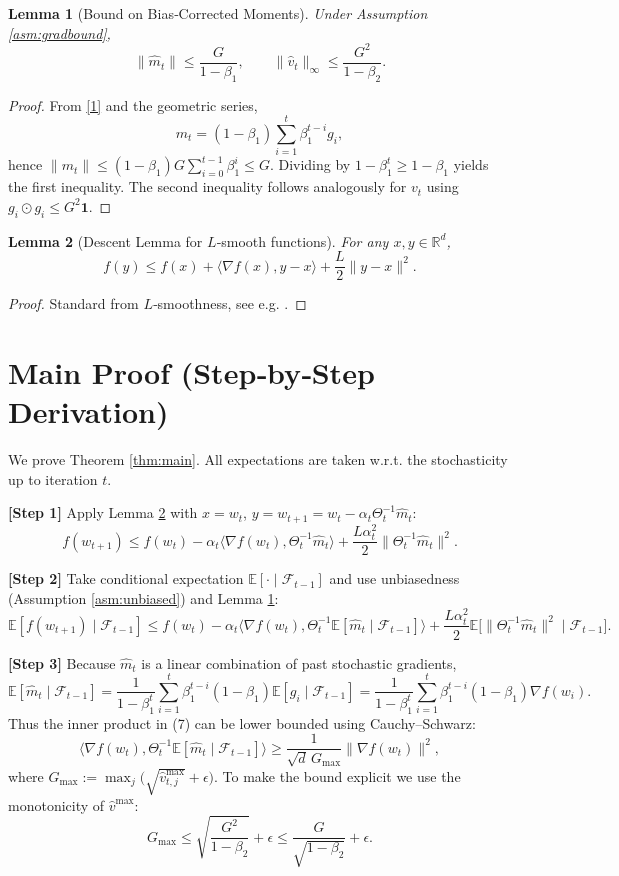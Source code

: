 \documentclass{article}
\newtheorem{lemma}{Lemma}
\begin{document}
\begin{lemma}[Bound on Bias‑Corrected Moments]\label{lem:bound_m}
Under Assumption \ref{asm:gradbound},
\[
\| \widehat m_t \| \le \frac{G}{1-\beta_1},\qquad
\|\widehat v_t\|_{\infty}\le\frac{G^2}{1-\beta_2}.
\]
\end{lemma}
\begin{proof}
From \eqref{1} and the geometric series,
\[
m_t = (1-\beta_1)\sum_{i=1}^{t}\beta_1^{t-i}g_i,
\]
hence $\|m_t\|\le (1-\beta_1)G\sum_{i=0}^{t-1}\beta_1^{i}\le G$.
Dividing by $1-\beta_1^{t}\ge 1-\beta_1$ yields the first inequality.
The second inequality follows analogously for $v_t$ using $g_i\odot g_i\le G^2\mathbf{1}$.
\end{proof}

\begin{lemma}[Descent Lemma for $L$‑smooth functions]\label{lem:descent}
For any $x,y\in\mathbb{R}^d$,
\[
f(y)\le f(x)+\langle\nabla f(x),y-x\rangle+\frac{L}{2}\|y-x\|^2.
\]
\end{lemma}
\begin{proof}
Standard from $L$‑smoothness, see e.g. \cite{Nesterov2004}.
\end{proof}

\section*{Main Proof (Step‑by‑Step Derivation)}
We prove Theorem \ref{thm:main}.  All expectations are taken w.r.t. the stochasticity up to iteration $t$.

\noindent\textbf{[Step 1]} Apply Lemma \ref{lem:descent} with $x=w_t$, $y=w_{t+1}=w_t-\alpha_t\Theta_t^{-1}\widehat m_t$:
\[
f(w_{t+1})\le f(w_t)-\alpha_t\langle\nabla f(w_t),\Theta_t^{-1}\widehat m_t\rangle
+\frac{L\alpha_t^{2}}{2}\|\Theta_t^{-1}\widehat m_t\|^{2}. \tag{6}
\]

\noindent\textbf{[Step 2]} Take conditional expectation $\mathbb{E}[\cdot\mid\mathcal{F}_{t-1}]$ and use unbiasedness (Assumption \ref{asm:unbiased}) and Lemma \ref{lem:bound_m}:
\[
\mathbb{E}[f(w_{t+1})\mid\mathcal{F}_{t-1}]
\le f(w_t)-\alpha_t\big\langle\nabla f(w_t),\Theta_t^{-1}\mathbb{E}[\widehat m_t\mid\mathcal{F}_{t-1}]\big\rangle
+\frac{L\alpha_t^{2}}{2}\mathbb{E}\!\big[\|\Theta_t^{-1}\widehat m_t\|^{2}\mid\mathcal{F}_{t-1}\big]. \tag{7}
\]

\noindent\textbf{[Step 3]} Because $\widehat m_t$ is a linear combination of past stochastic gradients,
\[
\mathbb{E}[\widehat m_t\mid\mathcal{F}_{t-1}]
= \frac{1}{1-\beta_1^{t}}\sum_{i=1}^{t}\beta_1^{t-i}(1-\beta_1)\mathbb{E}[g_i\mid\mathcal{F}_{t-1}]
= \frac{1}{1-\beta_1^{t}}\sum_{i=1}^{t}\beta_1^{t-i}(1-\beta_1)\nabla f(w_i).
\]
Thus the inner product in (7) can be lower bounded using Cauchy–Schwarz:
\[
\big\langle\nabla f(w_t),\Theta_t^{-1}\mathbb{E}[\widehat m_t\mid\mathcal{F}_{t-1}]\big\rangle
\ge \frac{1}{\sqrt{d}\,G_{\max}}\|\nabla f(w_t)\|^{2},
\]
where $G_{\max}:=\max_j\big(\sqrt{\widehat v_{t,j}^{\text{max}}}+\epsilon\big)$.
To make the bound explicit we use the monotonicity of $\widehat v^{\text{max}}$:
\[
G_{\max}\le \sqrt{\frac{G^{2}}{1-\beta_2}}+\epsilon\le \frac{G}{\sqrt{1-\beta_2}}+\epsilon. \tag{8}
\]
\end{document}
